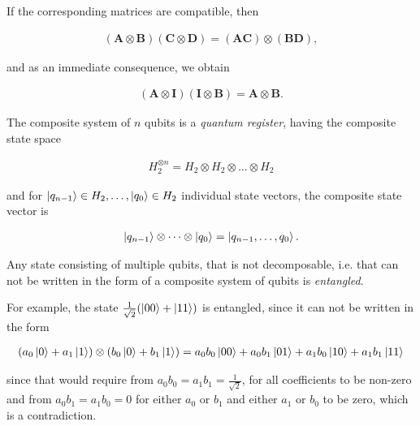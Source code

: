 \begin{property}
\label{TensorMixedProduct}

If the corresponding matrices are compatible, then

\begin{align*}
  (\mathbf{A} \otimes \mathbf{B})(\mathbf{C} \otimes \mathbf{D}) = (\mathbf{A}\mathbf{C}) \otimes (\mathbf{B}\mathbf{D}),
\end{align*}
\end{property}

and as an immediate consequence, we obtain 

\begin{align*}
  (\mathbf{A} \otimes \mathbf{I})(\mathbf{I} \otimes \mathbf{B}) = \mathbf{A} \otimes \mathbf{B}.
\end{align*}

\begin{definition}

The composite system of $n$ qubits is a \textit{quantum register}, having the composite state space

\begin{align*}
H_2^{\otimes{}n} = H_2 \otimes H_2 \otimes ... \otimes H_2
\end{align*}

and for $\ket{q_{n-1}} \in H_2, \dots, \ket{q_{0}} \in H_2$ individual state vectors, the composite state vector is

\begin{align*}
\ket{q_{n-1}} \otimes \dots \otimes \ket{q_{0}} = \ket{q_{n-1},\dots,q_0}.
\end{align*}

\end{definition}

\begin{definition}
Any state consisting of multiple qubits, that is not decomposable, i.e. that can not be written in the form of a composite system of qubits is \textit{entangled}.
\end{definition}

For example, the state $\frac{1}{\sqrt{2}}(\ket{00} + \ket{11})$ is entangled, since it can not be written in the form

\begin{align*}
(a_0\ket{0} + a_1\ket{1})\otimes(b_0\ket{0}+b_1\ket{1}) = a_0b_0\ket{00}+a_0b_1\ket{01}+a_1b_0\ket{10}+a_1b_1\ket{11}
\end{align*}

since that would require from $a_0b_0 = a_1b_1 = \frac{1}{\sqrt{2}}$, for all coefficients to be non-zero and from $a_0b_1 = a_1b_0 = 0$ for either $a_0$ or $b_1$ and either $a_1$ or $b_0$ to be zero, which is a contradiction.